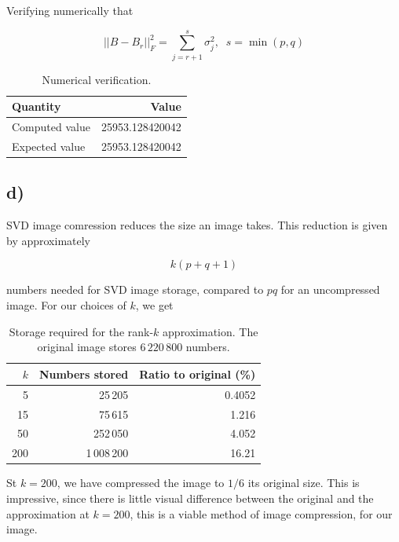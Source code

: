 \documentclass[conference]{IEEEtran}
\begin{document}
Verifying numerically that 

\begin{equation}
    ||B-B_r||_F^2=\sum_{j=r+1}^{s}\sigma_j^2,\;\;s=\min(p,q)
\end{equation}

\begin{table}[H]
  \centering
  \caption{Numerical verification.}
  \label{tab:verification}
  \begin{tabular}{lr}
    \toprule
    Quantity & Value \\
    \midrule
    Computed value & 25953.128420042 \\
    Expected value & 25953.128420042 \\
    \bottomrule
  \end{tabular}
\end{table}

\subsection{d)}

SVD image comression reduces the size an image takes. This reduction is given by approximately 

\begin{equation}
    k(p+q+1)
\end{equation}

numbers needed for SVD image storage, compared to $pq$ for an uncompressed image. For our choices of $k$, we get 

\begin{table}[H]
  \centering
  \caption{Storage required for the rank-$k$ approximation. The original image stores $6\,220\,800$ numbers.}
  \label{tab:storage}
  \begin{tabular}{rrr}
    \toprule
    $k$ & Numbers stored & Ratio to original (\%) \\
    \midrule
    5   & 25\,205    & 0.4052 \\
    15  & 75\,615    & 1.216  \\
    50  & 252\,050   & 4.052  \\
    200 & 1\,008\,200 & 16.21  \\
    \bottomrule
  \end{tabular}
\end{table}

St $k=200$, we have compressed the image to $1/6$ its original size. This is impressive, since there is little visual difference between the original and the approximation at $k=200$, this is a viable method of image compression, for our image. 
\end{document}
